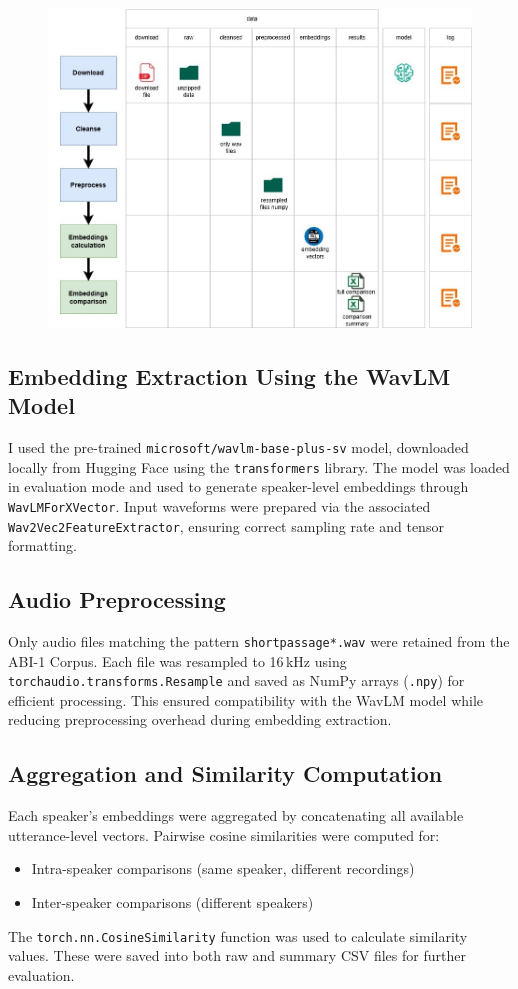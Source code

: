 \documentclass[conference]{IEEEtran}
\begin{document}
\begin{figure}[H]
	\centering
	\includegraphics[width=1\linewidth]{img/img-pipeline}
	\caption{}
	\label{fig:img-pipeline}
\end{figure}



\subsection*{Embedding Extraction Using the WavLM Model}
I used the pre-trained \texttt{microsoft/wavlm-base-plus-sv} model, downloaded locally from Hugging Face using the \texttt{transformers} library. The model was loaded in evaluation mode and used to generate speaker-level embeddings through \texttt{WavLMForXVector}. Input waveforms were prepared via the associated \texttt{Wav2Vec2FeatureExtractor}, ensuring correct sampling rate and tensor formatting.

\subsection*{Audio Preprocessing}
Only audio files matching the pattern \texttt{shortpassage*.wav} were retained from the ABI-1 Corpus. Each file was resampled to 16\,kHz using \texttt{torchaudio.transforms.Resample} and saved as NumPy arrays (\texttt{.npy}) for efficient processing. This ensured compatibility with the WavLM model while reducing preprocessing overhead during embedding extraction.

\subsection*{Aggregation and Similarity Computation}
Each speaker’s embeddings were aggregated by concatenating all available utterance-level vectors. Pairwise cosine similarities were computed for:
\begin{itemize}
	\item Intra-speaker comparisons (same speaker, different recordings)
	\item Inter-speaker comparisons (different speakers)
\end{itemize}
The \texttt{torch.nn.CosineSimilarity} function was used to calculate similarity values. These were saved into both raw and summary CSV files for further evaluation.
\end{document}
